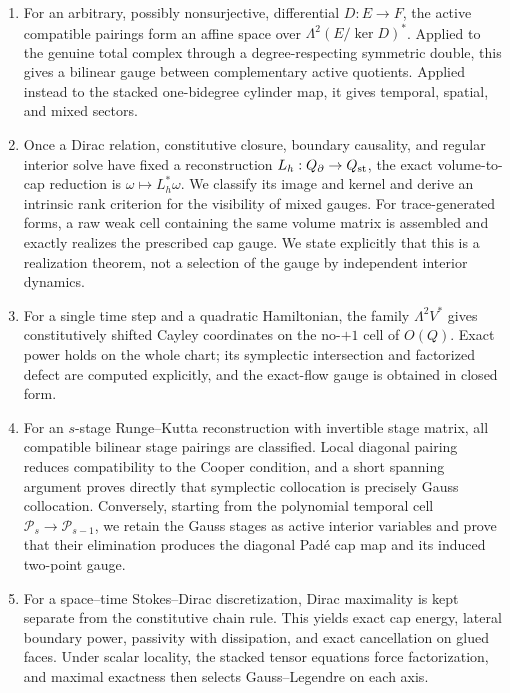 \documentclass[11pt,a4paper]{article}
\begin{document}
\begin{enumerate}
  \item For an arbitrary, possibly nonsurjective, differential
  \(D:E\to F\), the active compatible pairings form an affine space over
  \(\Lambda^2(E/\ker D)^*\).  Applied to the genuine total complex through
  a degree-respecting symmetric double, this gives a bilinear gauge between
  complementary active quotients.  Applied instead to the stacked
  one-bidegree cylinder map, it gives temporal, spatial, and mixed sectors.
  \item Once a Dirac relation, constitutive closure, boundary causality,
  and regular interior solve have fixed a reconstruction
  \(L_h:Q_\partial\to Q_{\rm st}\), the exact volume-to-cap reduction is
  \(\omega\mapsto L_h^*\omega\).  We classify its image and kernel and
  derive an intrinsic rank criterion for the visibility of mixed gauges.
  For trace-generated forms, a raw weak cell containing the same volume
  matrix is assembled and exactly realizes the prescribed cap gauge.  We
  state explicitly that this is a realization theorem, not a selection of
  the gauge by independent interior dynamics.
  \item For a single time step and a quadratic Hamiltonian, the family
  \(\Lambda^2V^*\) gives constitutively shifted Cayley coordinates on the
  no-\(+1\) cell of \(O(Q)\).  Exact power holds on the whole chart; its symplectic
  intersection and factorized defect are computed explicitly, and the
  exact-flow gauge is obtained in closed form.
  \item For an \(s\)-stage Runge--Kutta reconstruction with invertible
  stage matrix, all compatible bilinear stage pairings are classified.
  Local diagonal pairing reduces compatibility to the Cooper condition,
  and a short spanning argument proves directly that symplectic
  collocation is precisely Gauss collocation.  Conversely, starting from
  the polynomial temporal cell
  \(\mathcal P_s\to\mathcal P_{s-1}\), we retain the Gauss stages as
  active interior variables and prove that their elimination produces the
  diagonal Pad\'e cap map and its induced two-point gauge.
  \item For a space--time Stokes--Dirac discretization, Dirac maximality is
  kept separate from the constitutive chain rule.  This yields exact cap
  energy, lateral boundary power, passivity with dissipation, and exact
  cancellation on glued faces.  Under scalar locality, the stacked tensor
  equations force factorization, and maximal exactness then selects
  Gauss--Legendre on each axis.

\end{enumerate}
\end{document}
